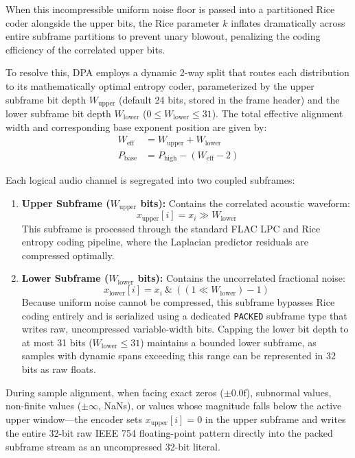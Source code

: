 \documentclass[10pt,twocolumn]{article}
\begin{document}
When this incompressible uniform noise floor is passed into a partitioned Rice coder alongside the upper bits, the Rice parameter $k$ inflates dramatically across entire subframe partitions to prevent unary blowout, penalizing the coding efficiency of the correlated upper bits.

To resolve this, DPA employs a dynamic 2-way split that routes each distribution to its mathematically optimal entropy coder, parameterized by the upper subframe bit depth $W_{\text{upper}}$ (default 24 bits, stored in the frame header) and the lower subframe bit depth $W_{\text{lower}}$ ($0 \le W_{\text{lower}} \le 31$). The total effective alignment width and corresponding base exponent position are given by:
\begin{align}
	W_{\text{eff}}  & = W_{\text{upper}} + W_{\text{lower}}    \\
	P_{\text{base}} & = P_{\text{high}} - (W_{\text{eff}} - 2)
\end{align}

Each logical audio channel is segregated into two coupled subframes:
\begin{enumerate}
	\item \textbf{Upper Subframe ($W_{\text{upper}}$ bits):} Contains the correlated acoustic waveform:
	      \begin{equation}
		      x_{\text{upper}}[i] = x_i \gg W_{\text{lower}}
	      \end{equation}
	      This subframe is processed through the standard FLAC LPC and Rice entropy coding pipeline, where the Laplacian predictor residuals are compressed optimally.
	\item \textbf{Lower Subframe ($W_{\text{lower}}$ bits):} Contains the uncorrelated fractional noise:
	      \begin{equation}
		      x_{\text{lower}}[i] = x_i \ \& \ ((1 \ll W_{\text{lower}}) - 1)
	      \end{equation}
	      Because uniform noise cannot be compressed, this subframe bypasses Rice coding entirely and is serialized using a dedicated \texttt{PACKED} subframe type that writes raw, uncompressed variable-width bits. Capping the lower bit depth to at most 31 bits ($W_{\text{lower}} \le 31$) maintains a bounded lower subframe, as samples with dynamic spans exceeding this range can be represented in 32 bits as raw floats.
\end{enumerate}

During sample alignment, when facing exact zeros ($\pm 0.0\text{f}$), subnormal values, non-finite values ($\pm\infty$, NaNs), or values whose magnitude falls below the active upper window---the encoder sets $x_{\text{upper}}[i] = 0$ in the upper subframe and writes the entire 32-bit raw IEEE 754 floating-point pattern directly into the packed subframe stream as an uncompressed 32-bit literal.
\end{document}
